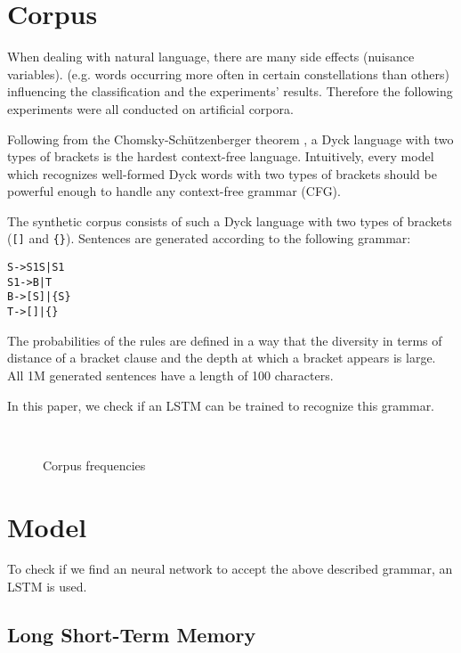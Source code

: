 \documentclass[11pt,a4paper]{article}
\newlength\figureheight
\newlength\figurewidth
\begin{document}
\section{Corpus}
\label{sec:corpus}
When dealing with natural language, there are many side effects (nuisance variables).  (e.g. words occurring more often in certain constellations than others) influencing the classification and the experiments' results. Therefore the following experiments were all conducted on artificial corpora.

Following from the Chomsky-Sch\"utzenberger theorem \cite{chomsky1963algebraic, autebert1997context}, a Dyck language with two types of brackets is the hardest context-free language. Intuitively, every model which recognizes well-formed Dyck words with two types of brackets should be powerful enough to handle any context-free grammar (CFG).

The synthetic corpus consists of such a Dyck language with two types of brackets (\verb|[]| and \verb|{}|). Sentences are generated according to the following grammar:

\begin{alltt}
    S  -> S1 S | S1
    S1 -> B | T
    B  -> [ S ] | \{ S \}
    T  -> [ ] | \{ \}
\end{alltt}

The probabilities of the rules are defined in a way that the diversity in terms of distance of a bracket clause and the depth at which a bracket appears is large. All 1M generated sentences have a length of 100 characters.

In this paper, we check if an LSTM can be trained to recognize this grammar.

\setlength\figureheight{4cm}
\setlength\figurewidth{\linewidth}
\begin{figure}[ht]
    \\%
    \caption{Corpus frequencies}%
    \label{fig:corpus_frequencies}%
\end{figure}

\section{Model}

To check if we find an neural network to accept the above described grammar, an LSTM is used.

\subsection{Long Short-Term Memory}
\end{document}
